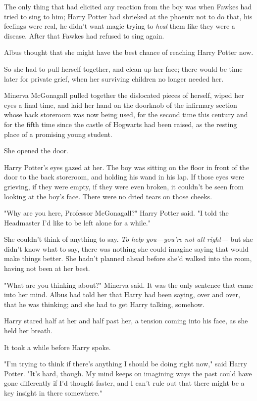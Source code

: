 The only thing that had elicited any reaction from the boy was when Fawkes had 
tried to sing to him; Harry Potter had shrieked at the phoenix not to do that, 
his feelings were real, he didn't want magic trying to \emph{heal} them like 
they were a disease. After that Fawkes had refused to sing again.

Albus thought that she might have the best chance of reaching Harry Potter now.

So she had to pull herself together, and clean up her face; there would be time 
later for private grief, when her surviving children no longer needed her.

Minerva McGonagall pulled together the dislocated pieces of herself, wiped her 
eyes a final time, and laid her hand on the doorknob of the infirmary section 
whose back storeroom was now being used, for the second time this century and 
for the fifth time since the castle of Hogwarts had been raised, as the resting 
place of a promising young student.

She opened the door.

Harry Potter's eyes gazed at her. The boy was sitting on the floor in front of 
the door to the back storeroom, and holding his wand in his lap. If those eyes 
were grieving, if they were empty, if they were even broken, it couldn't be 
seen from looking at the boy's face. There were no dried tears on those cheeks.

"Why are you here, Professor McGonagall?" Harry Potter said. "I told the 
Headmaster I'd like to be left alone for a while."

She couldn't think of anything to say. \emph{To help you---you're not all 
right---} but she didn't know what to say, there was nothing she could imagine 
saying that would make things better. She hadn't planned ahead before she'd 
walked into the room, having not been at her best.

"What are you thinking about?" Minerva said. It was the only sentence that came 
into her mind. Albus had told her that Harry had been saying, over and over, 
that he was thinking; and she had to get Harry talking, somehow.

Harry stared half at her and half past her, a tension coming into his face, as 
she held her breath.

It took a while before Harry spoke.

"I'm trying to think if there's anything I should be doing right now," said 
Harry Potter. "It's hard, though. My mind keeps on imagining ways the past 
could have gone differently if I'd thought faster, and I can't rule out that 
there might be a key insight in there somewhere."

